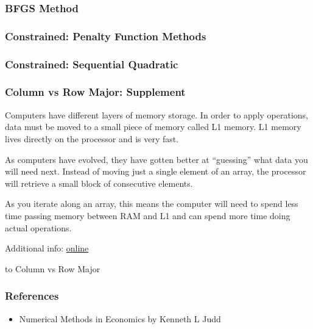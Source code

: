 \documentclass[10pt]{beamer}
\begin{document}
\begin{frame} \frametitle{BFGS Method}

\end{frame}

\begin{frame} \frametitle{Constrained: Penalty Function Methods}

\end{frame}

\begin{frame} \frametitle{Constrained: Sequential Quadratic}

\end{frame}


\appendix

\begin{frame}[label=ColRowMajor_Supp] \frametitle{Column vs Row Major: Supplement}
  Computers have different layers of memory storage. In order to apply operations, data must be moved to a small piece of memory called L1 memory. L1 memory lives directly on the processor and is very fast.

  As computers have evolved, they have gotten better at ``guessing'' what data you will need next. Instead of moving just a single element of an array, the processor will retrieve a small block of consecutive elements.

  As you iterate along an array, this means the computer will need to spend less time passing memory between RAM and L1 and can spend more time doing actual operations.

  Additional info: \href{https://www.extremetech.com/extreme/188776-how-l1-and-l2-cpu-caches-work-and-why-theyre-an-essential-part-of-modern-chips}{online}

  \hyperlink{ColRowMajor}{} to Column vs Row Major
\end{frame}

\begin{frame} \frametitle{References}
  \begin{itemize}
    \item Numerical Methods in Economics by Kenneth L Judd
  \end{itemize}
\end{frame}
\end{document}
